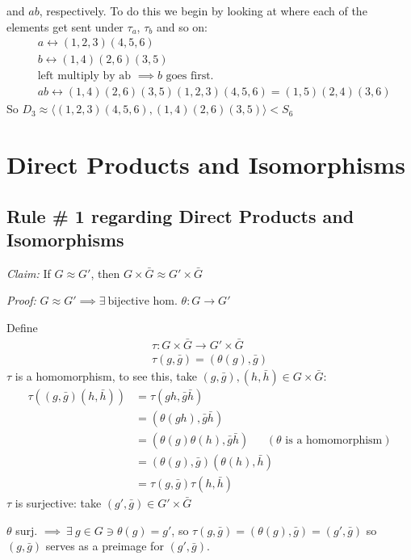 and $ab$, respectively. To do this we begin by looking at where each of the elements get sent under
$\tau_a$, $\tau_b$ and so on:
\begin{align}
    &a \longleftrightarrow (1,2,3)(4,5,6) \nonumber \\
    &b \longleftrightarrow (1,4)(2,6)(3,5) \nonumber \\
    &\text{left multiply by ab }\implies b \text{ goes first.} \nonumber \\
    &ab \longleftrightarrow (1,4)(2,6)(3,5)(1,2,3)(4,5,6)=(1,5)(2,4)(3,6) \nonumber
\end{align}
So $D_3 \approx \langle (1,2,3)(4,5,6), (1,4)(2,6)(3,5) \rangle < S_6$

\section*{Direct Products and Isomorphisms}
\subsection*{Rule \# 1 regarding Direct Products and Isomorphisms}
\textit{Claim:} If $G\approx G'$, then $G\times \bar{G}\approx G'\times \bar{G}$ \steezybreak

\noindent \textit{Proof:}
$G\approx G' \implies \exists \ \text{bijective hom. }\theta : G\rightarrow G'$ \steezybreak

\noindent Define
\begin{align}
    \tau: G\times \bar{G} \rightarrow G'\times \bar{G} \nonumber \\
    \tau(g,\bar{g}) = (\theta(g),\bar{g}) \nonumber
\end{align}
$\tau$ is a homomorphism, to see this, take $(g,\bar{g}), (h,\bar{h})\in G\times \bar{G}$:
\begin{align}
    \tau((g,\bar{g})(h,\bar{h}))&=\tau(gh,\bar{g}\bar{h}) \nonumber \\
    &= (\theta(gh),\bar{g}\bar{h}) \nonumber \\
    &= (\theta(g)\theta(h),\bar{g}\bar{h}) \ \ \ \ \ \ \ (\theta \text{ is a homomorphism}) \nonumber \\
    &= (\theta(g),\bar{g})(\theta(h),\bar{h}) \nonumber \\
    &= \tau(g,\bar{g})\tau(h,\bar{h}) \nonumber
\end{align}
$\tau$ is surjective: take $(g',\bar{g})\in G'\times \bar{G}$ \steezybreak

\noindent $\theta$ surj. $\implies \ \exists \ g\in G \ni \theta(g)=g'$, so
$\tau(g,\bar{g})=(\theta(g),\bar{g})=(g',\bar{g})$ so $(g,\bar{g})$ serves as a preimage for
$(g',\bar{g})$. \steezybreak

